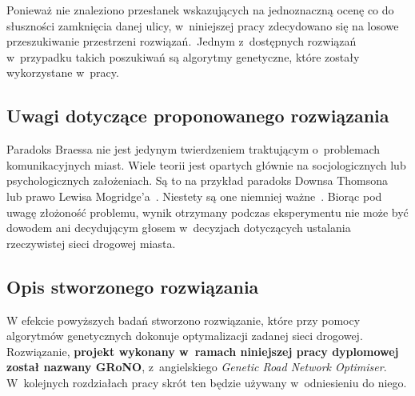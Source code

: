 \documentclass[twoside,12pt]{report}
\begin{document}
Ponieważ nie znaleziono przesłanek wskazujących na jednoznaczną ocenę co do słuszności zamknięcia danej ulicy, w~niniejszej pracy zdecydowano się na losowe przeszukiwanie przestrzeni rozwiązań.~Jednym z~dostępnych rozwiązań w~przypadku takich poszukiwań są algorytmy genetyczne, które zostały wykorzystane w~pracy.

\subsection{Uwagi dotyczące proponowanego rozwiązania}
Paradoks Braessa nie jest jedynym twierdzeniem traktującym o~problemach komunikacyjnych miast. Wiele teorii jest opartych głównie na socjologicznych lub psychologicznych założeniach. Są to na przykład paradoks Downsa Thomsona~\cite{urban} lub prawo Lewisa Mogridge’a~\cite{lewis}. Niestety są one niemniej ważne~\cite{investigation}. Biorąc pod uwagę złożoność problemu, wynik otrzymany podczas eksperymentu nie może być dowodem ani decydującym głosem w~decyzjach dotyczących ustalania rzeczywistej sieci drogowej miasta. 

\subsection{Opis stworzonego rozwiązania}
W efekcie powyższych badań stworzono rozwiązanie, które przy pomocy algorytmów genetycznych dokonuje optymalizacji zadanej sieci drogowej. Rozwiązanie, \textbf{projekt wykonany w~ramach niniejszej pracy dyplomowej został nazwany GRoNO}, z~angielskiego \textit{Genetic Road Network Optimiser}. W~kolejnych rozdziałach pracy skrót ten będzie używany w~odniesieniu do niego.

\end{document}
